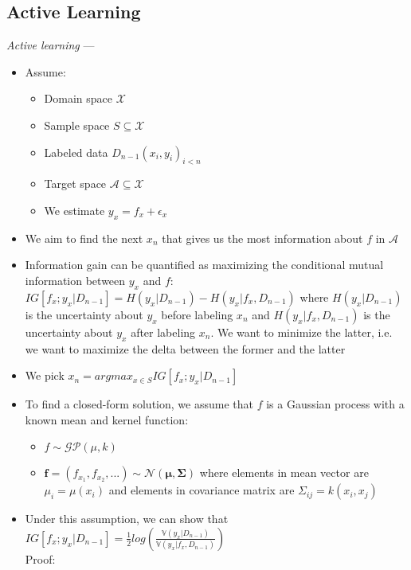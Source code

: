 \subsection*{Active Learning}
\emph{Active learning} ---
\begin{itemize}
    \item Assume:
    \begin{itemize}
        \item Domain space $\mathcal{X}$ 
        \item Sample space $S \subseteq \mathcal{X}$
        \item Labeled data $D_{n-1} {(x_i, y_i)}_{i < n}$
        \item Target space $\mathcal{A} \subseteq \mathcal{X}$
        \item We estimate $y_x = f_x + \epsilon_x$
    \end{itemize}
    \item We aim to find the next $x_n$ that gives us the most information about $f$ in $\mathcal{A}$
    \item Information gain can be quantified as maximizing the conditional mutual information between $y_x$ and $f$: $IG [ f_x; y_x | D_{n-1} ] = H(y_x | D_{n-1}) - H(y_x | f_x, D_{n-1})$ where $H(y_x | D_{n-1})$ is the uncertainty about $y_x$ before labeling $x_n$ and $H(y_x | f_x, D_{n-1})$ is the uncertainty about $y_x$ after labeling $x_n$. We want to minimize the latter, i.e. we want to maximize the delta between the former and the latter
    \item We pick $x_n = argmax_{x \in S} IG [ f_x; y_x | D_{n-1} ]$ 
    \item To find a closed-form solution, we assume that $f$ is a Gaussian process with a known mean and kernel function:
    \begin{itemize}
        \item $f \sim \mathcal{G}\mathcal{P} (\mu, k)$
        \item $\boldsymbol{f} = (f_{x_1}, f_{x_2}, ...) \sim \mathcal{N} (\boldsymbol{\mu}, \boldsymbol{\Sigma})$ where elements in mean vector are $\mu_i = \mu(x_i)$ and elements in covariance matrix are $\Sigma_{ij} = k(x_i,x_j)$
    \end{itemize}
    \item Under this assumption, we can show that $IG [ f_x; y_x | D_{n-1} ] = \frac{1}{2} log( \frac{ \mathbb{V} (y_x | D_{n-1}) }{ \mathbb{V} (y_x | f_x, D_{n-1}) } )$\\
    Proof:
    \begin{itemize}

\end{itemize}
\end{itemize}
